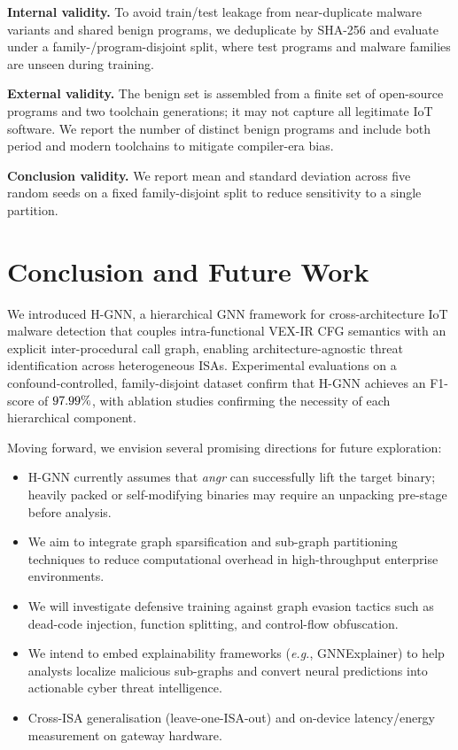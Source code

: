 \documentclass{llncs}
\newcommand{\method}{H-GNN}
\begin{document}
\textbf{Internal validity.} To avoid train/test leakage from near-duplicate malware variants and
shared benign programs, we deduplicate by SHA-256 and evaluate under a family-/program-disjoint split,
where test programs and malware families are unseen during training.

\textbf{External validity.} The benign set is assembled from a finite set of open-source programs and
two toolchain generations; it may not capture all legitimate IoT software. We report the number of
distinct benign programs and include both period and modern toolchains to mitigate compiler-era bias.

\textbf{Conclusion validity.} We report mean and standard deviation across five random seeds on a
fixed family-disjoint split to reduce sensitivity to a single partition.

\section{Conclusion and Future Work}
\label{sec:conclusion}

We introduced \method{}, a hierarchical GNN framework for cross-architecture
IoT malware detection that couples intra-functional VEX-IR CFG semantics
with an explicit inter-procedural call graph, enabling architecture-agnostic
threat identification across heterogeneous ISAs.
Experimental evaluations on a confound-controlled, family-disjoint
dataset confirm that \method{} achieves an F1-score of $97.99\%$, with
ablation studies confirming the necessity of each hierarchical component.

Moving forward, we envision several promising directions for future exploration:
\begin{itemize}
    \item {} \method{} currently assumes that \textit{angr}
    can successfully lift the target binary; heavily packed or self-modifying
    binaries may require an unpacking pre-stage before analysis.
    \item {} We aim to integrate
    graph sparsification and sub-graph partitioning techniques to reduce
    computational overhead in high-throughput enterprise environments.
    \item {} We will investigate defensive
    training against graph evasion tactics such as dead-code injection,
    function splitting, and control-flow obfuscation.
    \item {} We intend
    to embed explainability frameworks (\textit{e.g.}, GNNExplainer) to help
    analysts localize malicious sub-graphs and convert neural predictions into
    actionable cyber threat intelligence.
    \item Cross-ISA generalisation (leave-one-ISA-out) and on-device
    latency/energy measurement on gateway hardware.
\end{itemize}
\end{document}
